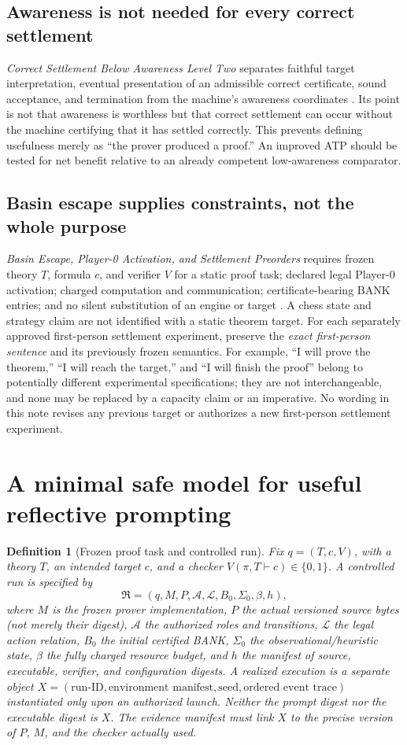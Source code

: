 \documentclass[11pt,letterpaper]{article}
\newtheorem{definition}{Definition}[section]
\begin{document}
\subsection{Awareness is not needed for every correct settlement}
\emph{Correct Settlement Below Awareness Level Two} separates faithful target interpretation, eventual presentation of an admissible correct certificate, sound acceptance, and termination from the machine's awareness coordinates \cite{lowaware}. Its point is not that awareness is worthless but that correct settlement can occur without the machine certifying that it has settled correctly. This prevents defining usefulness merely as ``the prover produced a proof.'' An improved ATP should be tested for net benefit relative to an already competent low-awareness comparator.

\subsection{Basin escape supplies constraints, not the whole purpose}
\emph{Basin Escape, Player-0 Activation, and Settlement Preorders} requires frozen theory $T$, formula $c$, and verifier $V$ for a static proof task; declared legal Player-0 activation; charged computation and communication; certificate-bearing BANK entries; and no silent substitution of an engine or target \cite{basin}. A chess state and strategy claim are not identified with a static theorem target. For each separately approved first-person settlement experiment, preserve the \emph{exact first-person sentence} and its previously frozen semantics. For example, ``I will prove the theorem,'' ``I will reach the target,'' and ``I will finish the proof'' belong to potentially different experimental specifications; they are not interchangeable, and none may be replaced by a capacity claim or an imperative. No wording in this note revises any previous target or authorizes a new first-person settlement experiment.

\section{A minimal safe model for useful reflective prompting}
\begin{definition}[Frozen proof task and controlled run]
Fix $q=(T,c,V)$, with a theory $T$, an intended target $c$, and a checker $V(\pi,T\vdash c)\in\{0,1\}$. A controlled run is specified by
\[
\mathfrak R=(q,M,P,\mathcal A,\mathcal L,B_0,\Sigma_0,\beta,h),
\]
where $M$ is the frozen prover implementation, $P$ the \emph{actual versioned source bytes} (not merely their digest), $\mathcal A$ the authorized roles and transitions, $\mathcal L$ the legal action relation, $B_0$ the initial certified BANK, $\Sigma_0$ the observational/heuristic state, $\beta$ the fully charged resource budget, and $h$ the manifest of source, executable, verifier, and configuration digests. A realized execution is a separate object $X=(\text{run-ID},\text{environment manifest},\text{seed},\text{ordered event trace})$ instantiated only upon an authorized launch. Neither the prompt digest nor the executable digest \emph{is} $X$. The evidence manifest must link $X$ to the precise version of $P$, $M$, and the checker actually used.
\end{definition}
\end{document}
